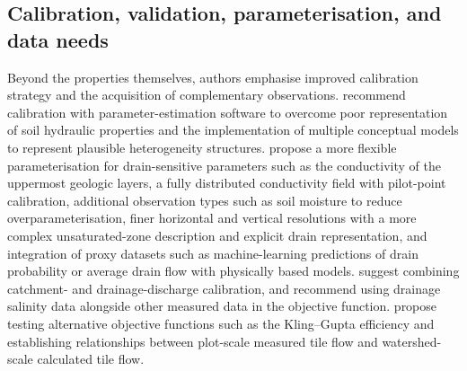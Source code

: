 \documentclass[11pt]{article}
\begin{document}
\subsection{Calibration, validation, parameterisation, and data needs}

Beyond the properties themselves, authors emphasise improved calibration
strategy and the acquisition of complementary observations.
\textcite{Boico2022} recommend calibration with parameter-estimation software
to overcome poor representation of soil hydraulic properties and the
implementation of multiple conceptual models to represent plausible
heterogeneity structures. \textcite{Schneider2022} propose a more flexible
parameterisation for drain-sensitive parameters such as the conductivity of
the uppermost geologic layers, a fully distributed conductivity field with
pilot-point calibration, additional observation types such as soil moisture to
reduce overparameterisation, finer horizontal and vertical resolutions with a
more complex unsaturated-zone description and explicit drain representation,
and integration of proxy datasets such as machine-learning predictions of
drain probability or average drain flow with physically based models.
\textcite{DeSchepper2017} suggest combining catchment- and drainage-discharge
calibration, and \textcite{Sedaghatdoost2019} recommend using drainage
salinity data alongside other measured data in the objective function.
\textcite{Brighenti2023} propose testing alternative objective functions such
as the Kling--Gupta efficiency and establishing relationships between
plot-scale measured tile flow and watershed-scale calculated tile flow.
\end{document}
